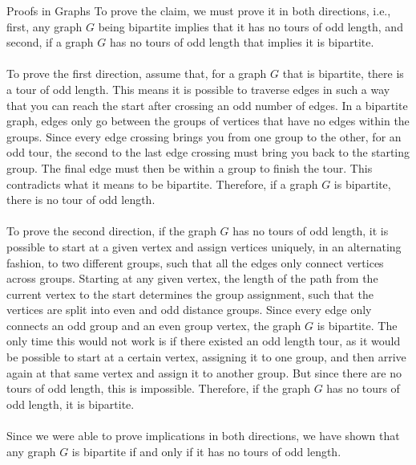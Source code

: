 \begin{homeworkProblem}{Proofs in Graphs}
    To prove the claim, we must prove it in both directions, i.e., first, any graph $G$ being bipartite implies that it has no tours of odd length, and second, if a graph $G$ has no tours of odd length that implies it is bipartite. 
    \\ \\
    To prove the first direction, assume that, for a graph $G$ that is bipartite, there is a tour of odd length. This means it is possible to traverse edges in such a way that you can reach the start after crossing an odd number of edges. In a bipartite graph, edges only go between the groups of vertices that have no edges within the groups. Since every edge crossing brings you from one group to the other, for an odd tour, the second to the last edge crossing must bring you back to the starting group. The final edge must then be within a group to finish the tour. This contradicts what it means to be bipartite. Therefore, if a graph $G$ is bipartite, there is no tour of odd length.
    \\ \\
    To prove the second direction, if the graph $G$ has no tours of odd length, it is possible to start at a given vertex and assign vertices uniquely, in an alternating fashion, to two different groups, such that all the edges only connect vertices across groups. Starting at any given vertex, the length of the path from the current vertex to the start determines the group assignment, such that the vertices are split into even and odd distance groups. Since every edge only connects an odd group and an even group vertex, the graph $G$ is bipartite. The only time this would not work is if there existed an odd length tour, as it would be possible to start at a certain vertex, assigning it to one group, and then arrive again at that same vertex and assign it to another group. But since there are no tours of odd length, this is impossible. Therefore, if the graph $G$ has no tours of odd length, it is bipartite. 
    \\ \\
    Since we were able to prove implications in both directions, we have shown that any graph $G$ is bipartite if and only if it has no tours of odd length. 
    
\end{homeworkProblem}